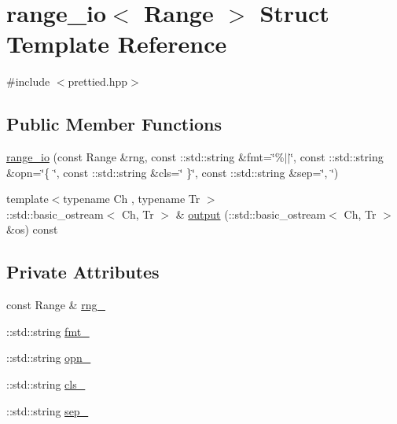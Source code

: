\hypertarget{structyuh_1_1range__detail_1_1range__io}{\section{range\-\_\-io$<$ \-Range $>$ \-Struct \-Template \-Reference}
\label{da/d75/structyuh_1_1range__detail_1_1range__io}
}


{\ttfamily \#include $<$prettied.\-hpp$>$}

\subsection*{\-Public \-Member \-Functions}
\begin{DoxyCompactItemize}
\item 
\hyperlink{structyuh_1_1range__detail_1_1range__io_a07dd61c44cd3468641b61116bba389ab}{range\-\_\-io} (const \-Range \&rng, const \-::std\-::string \&fmt=\char`\"{}\%$|$$|$\char`\"{}, const \-::std\-::string \&opn=\char`\"{}\{ \char`\"{}, const \-::std\-::string \&cls=\char`\"{} \}\char`\"{}, const \-::std\-::string \&sep=\char`\"{}, \char`\"{})
\item 
{\footnotesize template$<$typename Ch , typename Tr $>$ }\\\-::std\-::basic\-\_\-ostream$<$ \-Ch, \-Tr $>$ \& \hyperlink{structyuh_1_1range__detail_1_1range__io_ac2527e538be4125c8410ff76542c7b60}{output} (\-::std\-::basic\-\_\-ostream$<$ \-Ch, \-Tr $>$ \&os) const 
\end{DoxyCompactItemize}
\subsection*{\-Private \-Attributes}
\begin{DoxyCompactItemize}
\item 
const \-Range \& \hyperlink{structyuh_1_1range__detail_1_1range__io_a1dc23cf32ae84636d442489c9629b987}{rng\-\_\-}
\item 
\-::std\-::string \hyperlink{structyuh_1_1range__detail_1_1range__io_a10e6f92b15963cf8b984dcd448cb88cc}{fmt\-\_\-}
\item 
\-::std\-::string \hyperlink{structyuh_1_1range__detail_1_1range__io_a18de53e582d18b754d97ebc4c23a24f2}{opn\-\_\-}
\item 
\-::std\-::string \hyperlink{structyuh_1_1range__detail_1_1range__io_a91d9929bdbd7f866ff9823f657a36d35}{cls\-\_\-}
\item 
\-::std\-::string \hyperlink{structyuh_1_1range__detail_1_1range__io_ae32c4a9c66e100eb1bc143c4e851fb2f}{sep\-\_\-}
\end{DoxyCompactItemize}


